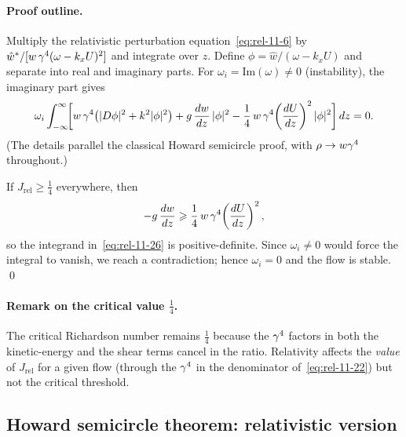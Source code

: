 \paragraph{Proof outline.}
Multiply the relativistic perturbation equation~\eqref{eq:rel-11-6}
by $\hat{w}^{*}/[w\,\gamma^{4}(\omega-k_{x}U)^{2}]$ and
integrate over $z$.  Define
$\phi=\hat{w}/(\omega-k_{x}U)$ and separate into real and imaginary
parts.  For $\omega_{i}=\mathrm{Im}(\omega)\neq 0$ (instability),
the imaginary part gives
\begin{equation}
\label{eq:rel-11-26}
\omega_{i}\int_{-\infty}^{\infty}\!
\biggl[
  w\,\gamma^{4}\bigl(|D\phi|^{2}+k^{2}|\phi|^{2}\bigr)
  + g\,\frac{dw}{dz}\,|\phi|^{2}
  - \frac{1}{4}\,w\,\gamma^{4}\!\left(\frac{dU}{dz}\right)^{2}
    |\phi|^{2}
\biggr]\,dz = 0.
\end{equation}
(The details parallel the classical Howard semicircle proof, with
$\rho\to w\gamma^{4}$ throughout.)

If $J_{\mathrm{rel}}\geqslant\frac{1}{4}$ everywhere, then
\begin{equation}
\label{eq:rel-11-27}
-g\,\frac{dw}{dz}
\geqslant \frac{1}{4}\,w\,\gamma^{4}\!\left(\frac{dU}{dz}\right)^{2},
\end{equation}
so the integrand in~\eqref{eq:rel-11-26} is positive-definite.  Since
$\omega_{i}\neq 0$ would force the integral to vanish, we reach a
contradiction; hence $\omega_{i}=0$ and the flow is stable.  \qed

\paragraph{Remark on the critical value $\frac{1}{4}$.}
The critical Richardson number remains $\frac{1}{4}$ because the
$\gamma^{4}$ factors in both the kinetic-energy and the shear terms
cancel in the ratio.  Relativity affects the \emph{value} of $J_{\mathrm{rel}}$
for a given flow (through the $\gamma^{4}$ in the denominator
of~\eqref{eq:rel-11-22}) but not the critical threshold.

\subsection{Howard semicircle theorem: relativistic version}

